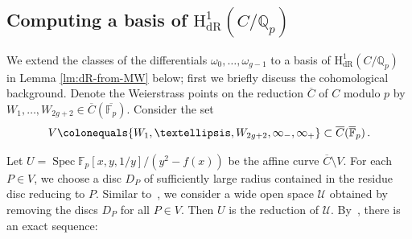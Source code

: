 \documentclass[11pt, a4paper]{amsart}
\newcommand{\Q}{\mathbb{Q}}
\newcommand{\C}{\mathbb{C}}
\newcommand{\calU}{\mathcal{U}}
\newcommand{\F}{\mathbb{F}}
\newcommand{\hdr}{\operatorname{H^1_{dR}}}
\newcommand{\Spec}{\operatorname{Spec}}
\theoremstyle{remark}
\numberwithin{equation}{section}
\newcommand{\sg}{{}}
\newcommand{\sm}{{}}
\begin{document}

\subsection{Computing a basis of $\hdr(C/\Q_p)$}\label{basis}
\sm{We extend the classes of the differentials $\omega_0,\ldots,\omega_{g-1}$ to a basis of $\hdr(C/\Q_p)$ in
Lemma \ref{lm:dR-from-MW} below;} first we briefly discuss the cohomological background.
Denote the Weierstrass points on the reduction $\overline{C}$ of $C$ modulo $p$ by $W_1,\ldots,W_{2g+2}\in \overline{C}(\overline{\F_p})$. 
Consider the set
\[
V\colonequals \{W_1,\ldots,W_{2g+2},\infty_-,\infty_+\}\subset
\overline{C}(\overline{\F}_p)\,.
\]

Let $U=\Spec\F_p[x,y,1/y]/(y^2-f(x))$ be the affine curve
$\overline{C}\setminus V$. 
\sm{For each $P\in V$, we choose a disc $D_P$ of sufficiently large  radius contained in the residue disc reducing to $P$. Similar
to~\cite{BBHeights}, we consider a wide open space $\calU$ obtained
by removing the discs $D_P$ for all $P\in V$.
Then $U$ is the reduction of $\calU$.
By~\cite[Proposition 4.8]{Besser-Syntomic-2}, there is an exact sequence:
}

\end{document}
